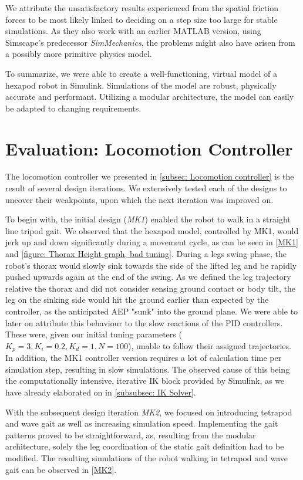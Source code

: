 We attribute the unsatisfactory results \cite{thilderkvist2015motion} experienced from the spatial friction forces to be most likely linked to deciding on a step size too large for stable simulations.
As they also work with an earlier MATLAB version, using Simscape's predecessor \textit{SimMechanics}, the problems might also have arisen from a possibly more primitive physics model.

To summarize, we were able to create a well-functioning, virtual model of a hexapod robot in Simulink.
Simulations of the model are robust, physically accurate and performant.
Utilizing a modular architecture, the model can easily be adapted to changing requirements.
 

\section{Evaluation: Locomotion Controller}
The locomotion controller we presented in \ref{subsec: Locomotion controller} is the result of several design iterations.
We extensively tested each of the designs to uncover their weakpoints, upon which the next iteration was improved on.

To begin with, the initial design (\textit{MK1}) enabled the robot to walk in a straight line tripod gait.
We observed that the hexapod model, controlled by MK1, would jerk up and down significantly during a movement cycle, as can be seen in [\hyperref[vid: MK1]{MK1}] and \ref{figure: Thorax Height graph, bad tuning}.
During a legs swing phase, the robot's thorax would slowly sink towards the side of the lifted leg and be rapidly pushed upwards again at the end of the swing.
As we defined the leg trajectory relative the thorax and did not consider sensing ground contact or body tilt, the leg on the sinking side would hit the ground earlier than expected by the controller, as the anticipated AEP "sunk" into the ground plane.
We were able to later on attribute this behaviour to the slow reactions of the PID controllers.
These were, given our initial tuning parameters ($K_p = 3, K_i = 0.2, K_d = 1, N = 100$), unable to follow their assigned trajectories. 
In addition, the MK1 controller version requires a lot of calculation time per simulation step, resulting in slow simulations.
The observed cause of this being the computationally intensive, iterative IK block provided by Simulink, as we have already elaborated on in \ref{subsubsec: IK Solver}.

With the subsequent design iteration \textit{MK2}, we focused on introducing tetrapod and wave gait as well as increasing simulation speed.
Implementing the gait patterns proved to be straightforward, as, resulting from the modular architecture, solely the leg coordination of the static gait definition had to be modified.
The resulting simulations of the robot walking in tetrapod and wave gait can be observed in [\hyperref[vid: MK1]{MK2}].

